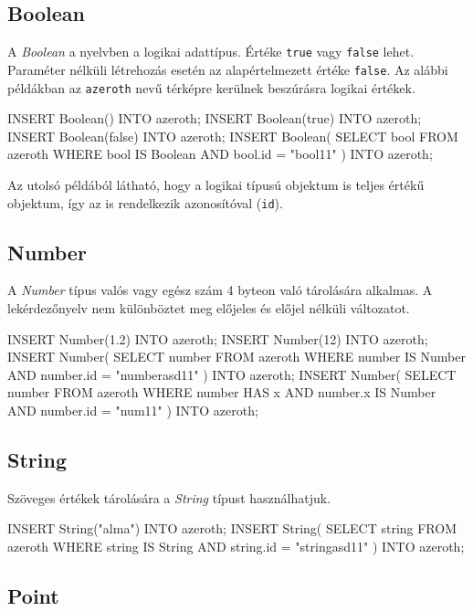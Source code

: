 \subsection{Boolean}

A \textit{Boolean} a nyelvben a logikai adattípus. Értéke \texttt{true} vagy \texttt{false} lehet. Paraméter nélküli létrehozás esetén az alapértelmezett értéke \texttt{false}. Az alábbi példákban az \texttt{azeroth} nevű térképre kerülnek beszúrásra logikai értékek.

\begin{sql}
INSERT Boolean() INTO azeroth;
INSERT Boolean(true) INTO azeroth; 
INSERT Boolean(false) INTO azeroth;
INSERT Boolean(
    SELECT bool FROM azeroth
    WHERE bool IS Boolean AND bool.id = "bool11"
) INTO azeroth;
\end{sql}

Az utolsó példából látható, hogy a logikai típusú objektum is teljes értékű objektum, így az is rendelkezik azonosítóval (\texttt{id}).

\subsection{Number}

A \textit{Number} típus valós vagy egész szám 4 byteon való tárolására alkalmas. A lekérdezőnyelv nem különböztet meg előjeles és előjel nélküli változatot.

\begin{sql}
INSERT Number(1.2) INTO azeroth;
INSERT Number(12) INTO azeroth;
INSERT Number(
    SELECT number FROM azeroth
    WHERE number IS Number AND number.id = "numberasd11"
) INTO azeroth;
INSERT Number(
    SELECT number FROM azeroth
    WHERE number HAS x AND number.x IS Number AND number.id = "num11"
) INTO azeroth;
\end{sql}

\subsection{String}

Szöveges értékek tárolására a \textit{String} típust használhatjuk.

\begin{sql}
INSERT String("alma") INTO azeroth;
INSERT String(
    SELECT string FROM azeroth
    WHERE string IS String AND string.id = "stringasd11"
)
INTO azeroth;
\end{sql}

\subsection{Point}


